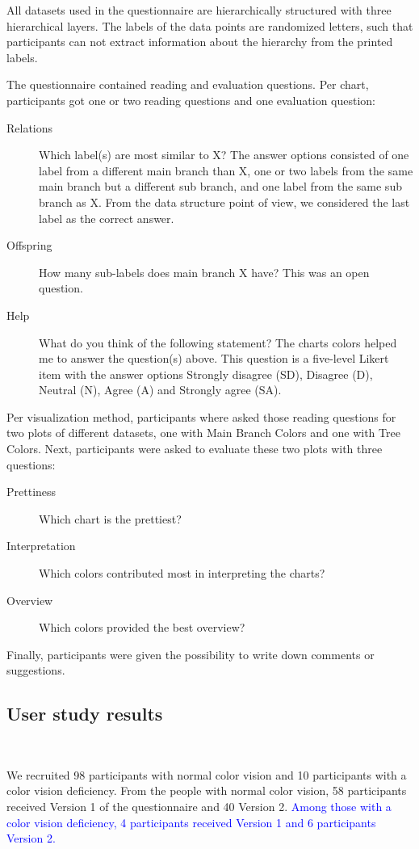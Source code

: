 \documentclass[review,journal]{vgtc}         %
\newcommand{\changedM}[1]{\textcolor{blue}{#1}}
\begin{document}
All datasets used in the questionnaire are hierarchically structured with three hierarchical layers. The 
labels of the data points are randomized letters, such that participants can not extract information 
about the hierarchy from the printed labels.

The questionnaire contained reading and evaluation questions. Per chart, participants got one or two reading questions and one evaluation question:
\begin{description}
\item[Relations] Which label(s) are most similar to X? The answer options consisted of one label from a different main branch than X, one or two labels from the same main branch but a different sub branch, and one label from the same sub branch as X. From the data structure point of view, we considered the last label as the correct answer.
\item[Offspring] How many sub-labels does main branch X have? This was an open question.
\item[Help] What do you think of the following statement? The charts colors helped me to answer the question(s) above. This question is a five-level Likert item with the answer options Strongly disagree (SD), Disagree (D), Neutral (N), Agree (A) and Strongly agree (SA).
\end{description}
Per visualization method, participants where asked those reading questions for two plots of different datasets, one with Main Branch Colors and one with Tree Colors. 
Next, participants were asked to evaluate these two plots with three questions:
\begin{description}
\item[Prettiness] Which chart is the prettiest?
\item[Interpretation] Which colors contributed most in interpreting the charts?
\item[Overview] Which colors provided the best overview?
\end{description}
Finally, participants were given the possibility to write down comments or suggestions.

\subsection{User study results}~\label{secuserres}

We recruited 98 participants with normal color vision and 10 participants with a color vision deficiency. From the people with normal color vision, 58 participants received Version 1 of the questionnaire and 40 Version 2. \changedM{Among those with a color vision deficiency, 4 participants received Version 1 and 6 participants Version 2.}
\end{document}
